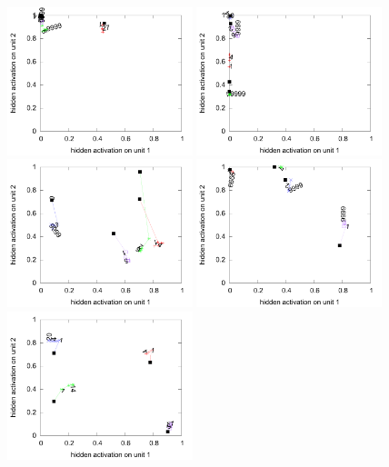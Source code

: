 \begin{figure}[H]
  \centering
  \includegraphics[width=0.48\textwidth]{img/hid-bal-bad-init.pdf}  
  \includegraphics[width=0.48\textwidth]{img/hid-bal-bad-convex.pdf}  \\
  \includegraphics[width=0.48\textwidth]{img/hid-bal-bad-step.pdf}  
  \includegraphics[width=0.48\textwidth]{img/hid-bal-bad-stagnation.pdf}  \\
  \includegraphics[width=0.48\textwidth]{img/hid-bal-good-init.pdf}  

\end{figure}
